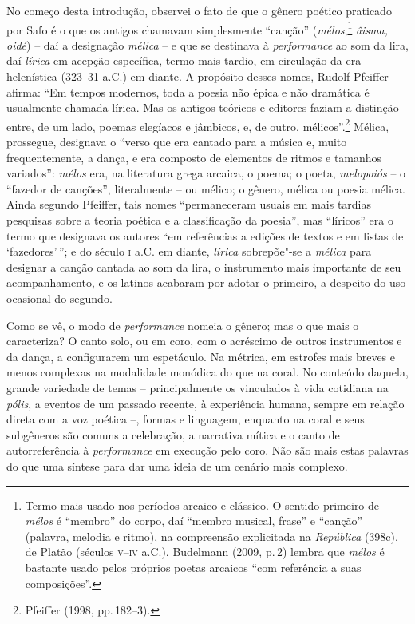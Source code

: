 No começo desta introdução, observei o fato de que o gênero poético praticado
por Safo é o que os antigos chamavam simplesmente “canção”
(\textit{mélos},\footnote{ Termo mais usado nos períodos arcaico e clássico.
O sentido primeiro de \textit{mélos} é “membro” do corpo, daí “membro
musical, frase” e “canção” (palavra, melodia e ritmo), na compreensão
explicitada na \textit{República} (398c), de Platão (séculos \textsc{v}--\textsc{iv} a.C.).
Budelmann (2009, p.\,2) lembra que \textit{mélos} é bastante usado pelos próprios poetas arcaicos ``com referência a suas composições”.} \textit{âisma, oidé}) -- daí a
designação \textit{mélica} -- e que se destinava à \textit{performance} ao som
da lira, daí \textit{lírica} em acepção específica, termo mais tardio, em
circulação da era helenística (323--31 a.C.) em diante. A propósito
desses nomes, Rudolf Pfeiffer afirma: “Em tempos
modernos, toda a poesia não épica e não dramática é usualmente chamada lírica.
Mas os antigos teóricos e editores faziam a distinção entre, de um lado, poemas
elegíacos e jâmbicos, e, de outro, mélicos”.\footnote{ Pfeiffer (1998, pp.\,182--3).} Mélica, prossegue,
designava o “verso que era cantado para a música e, muito frequentemente, a
dança, e era composto de elementos de ritmos e tamanhos variados”:
\textit{mélos} era, na literatura grega arcaica, o poema; o poeta,
\textit{melopoiós} -- o “fazedor de canções”, literalmente -- ou mélico; o
gênero, mélica ou poesia mélica. Ainda segundo Pfeiffer, tais nomes
“permaneceram usuais em mais tardias pesquisas sobre a teoria poética e a
classificação da poesia”, mas “líricos” era o termo que designava os autores
“em referências a edições de textos e em listas de ‘fazedores’\,”; e do século \textsc{i}
a.C. em diante, \textit{lírica} sobrepõe"-se a \textit{mélica} para designar a canção
cantada ao som da lira, o instrumento mais importante de seu acompanhamento, e
os latinos acabaram por adotar o primeiro, a despeito do uso ocasional do
segundo.

Como se vê, o modo de \textit{performance} nomeia o gênero;
mas o que mais o caracteriza? O canto solo,
ou em coro, com o acréscimo de
outros instrumentos e da dança, a configurarem um espetáculo. Na métrica,
em estrofes mais breves e menos
complexas na modalidade monódica do que na coral. No conteúdo daquela, grande variedade de temas -- principalmente os vinculados à
vida cotidiana na \textit{pólis}, a eventos de um passado recente, à
experiência humana, sempre em relação direta com a voz poética --, formas e
linguagem, enquanto na coral e seus subgêneros são comuns a celebração, a
narrativa mítica e o canto de autorreferência à \textit{performance} em
execução pelo coro. Não são mais estas palavras do que uma síntese para dar uma ideia de um cenário mais complexo. 


